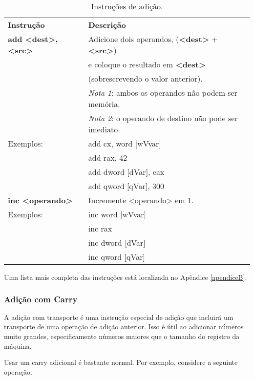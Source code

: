 \begin{table}[ht]
	\begin{center}
			\begin{tabular}{|ll|}
				\hline
				\rowcolor[HTML]{C0C0C0}
				\textbf{Instrução} & \textbf{Descrição} \\ 
				\textbf{add <dest>, <src>} & Adicione dois operandos, (\textbf{<dest>} + \textbf{<src>})\\
				& e coloque o resultado em \textbf{<dest>}\\
				&(sobrescrevendo o valor anterior).\\
				& \textit{Nota 1}: ambos os operandos não podem ser memória.\\
				& \textit{Nota 2}: o operando de destino não pode ser imediato.\\
			   Exemplos:& add cx, word [wVvar]\\
			   &add rax, 42\\
			   &add dword [dVar], eax\\
			   &add qword [qVar], 300\\\hline
			   \textbf{inc <operando>} &Incremente <operando> em 1.\\
			   Exemplos:& inc word [wVvar]\\
			   &inc rax\\
			   &inc dword [dVar]\\
			   &inc qword [qVar]\\ \hline			   	
		\end{tabular}%
	\end{center}
	\caption{Instruções de adição.}
	\label{tab:add}
\end{table}

Uma lista mais completa das instruções está localizada no Apêndice \ref{apendiceB}.

\subsubsection{Adição com Carry}
A adição com transporte é uma instrução especial de adição que incluirá um transporte de uma operação de adição anterior. Isso é útil ao adicionar números muito grandes, especificamente números maiores que o tamanho do registro da máquina.

Usar um carry adicional é bastante normal. Por exemplo, considere a seguinte operação.

\begin{center}
	
\end{center}

